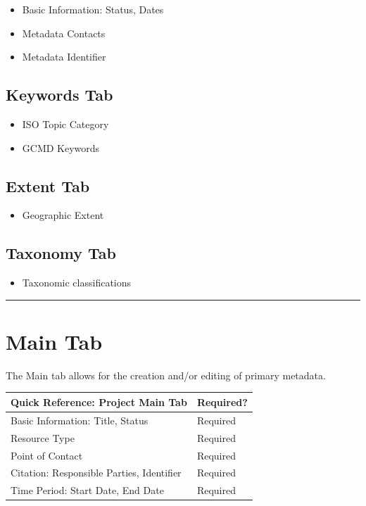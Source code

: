 \documentclass[
]{book}
\providecommand{\tightlist}{%
  \setlength{\itemsep}{0pt}\setlength{\parskip}{0pt}}
\begin{document}
\begin{itemize}
\tightlist
\item
  Basic Information: Status, Dates
\item
  Metadata Contacts
\item
  Metadata Identifier
\end{itemize}

\hypertarget{keywords-tab}{%
\subsection{Keywords Tab}\label{keywords-tab}}

\begin{itemize}
\tightlist
\item
  ISO Topic Category
\item
  GCMD Keywords
\end{itemize}

\hypertarget{extent-tab}{%
\subsection{Extent Tab}\label{extent-tab}}

\begin{itemize}
\tightlist
\item
  Geographic Extent
\end{itemize}

\hypertarget{taxonomy-tab}{%
\subsection{Taxonomy Tab}\label{taxonomy-tab}}

\begin{itemize}
\tightlist
\item
  Taxonomic classifications
\end{itemize}

\begin{center}\rule{0.5\linewidth}{\linethickness}\end{center}

\hypertarget{project-main}{%
\section{Main Tab}\label{project-main}}

The Main tab allows for the creation and/or editing of primary metadata.

\begin{longtable}[]{@{}ll@{}}
\toprule
Quick Reference: Project Main Tab & Required?\tabularnewline
\midrule
\endhead
Basic Information: Title, Status & Required\tabularnewline
Resource Type & Required\tabularnewline
Point of Contact & Required\tabularnewline
Citation: Responsible Parties, Identifier & Required\tabularnewline
Time Period: Start Date, End Date & Required\tabularnewline
\bottomrule
\end{longtable}
\end{document}
